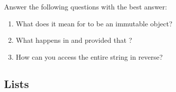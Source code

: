 \begin{problem}
Answer the following questions with the best answer:

\begin{enumerate}

\item What does it mean for  to be an immutable object? 
\item What happens in  and  provided 
that ? 
\item How can you access the entire string in reverse?

\end{enumerate}
\end{problem}

\subsection*{Lists}
